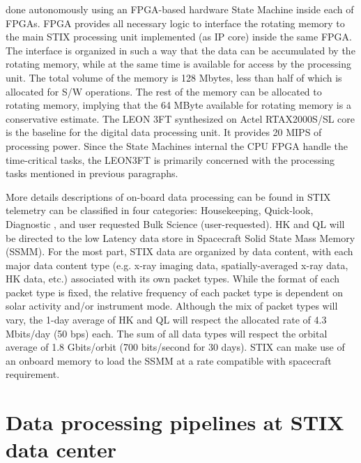 \documentclass{aa}
\begin{document}
done autonomously using an FPGA-based hardware State Machine inside each of FPGAs.
FPGA provides all necessary logic to interface the rotating memory to the main STIX
processing unit implemented (as IP core) inside the same FPGA. The interface is organized
in such a way that the data can be accumulated by the rotating memory, while at the same
time is available for access by the processing unit. The total volume of the memory is 128
Mbytes, less than half of which is allocated for S/W operations. The rest of the memory can
be allocated to rotating memory, implying that the 64 MByte available for rotating memory is
a conservative estimate.
The LEON 3FT synthesized on Actel RTAX2000S/SL core is the baseline for the digital data
processing unit. It provides 20 MIPS of processing power. Since the State Machines internal
the CPU FPGA handle the time-critical tasks, the LEON3FT is primarily concerned with the
processing tasks mentioned in previous paragraphs.


More details descriptions of on-board data processing can be found in 
STIX telemetry can be classified in four categories: Housekeeping, Quick-look, Diagnostic
, and user requested Bulk Science (user-requested). HK and QL will be directed to the
 low Latency data store in Spacecraft Solid State Mass Memory (SSMM). 
For the most part, STIX data are organized by data content, with each major data content type
(e.g. x-ray imaging data, spatially-averaged x-ray data, HK data, etc.) associated with its own
packet types. While the format of each packet type is fixed, the relative frequency of each
packet type is dependent on solar activity and/or instrument mode.
Although the mix of packet types will vary, the 1-day average of HK and QL will respect the allocated rate of 4.3 Mbits/day (50 bps) each. The sum of all data types will respect the orbital average of 1.8 Gbits/orbit (700 bits/second for 30 days). STIX can make use of an onboard memory to load the SSMM at a rate compatible with spacecraft requirement.

\section{Data processing pipelines at STIX data center}
\end{document}
